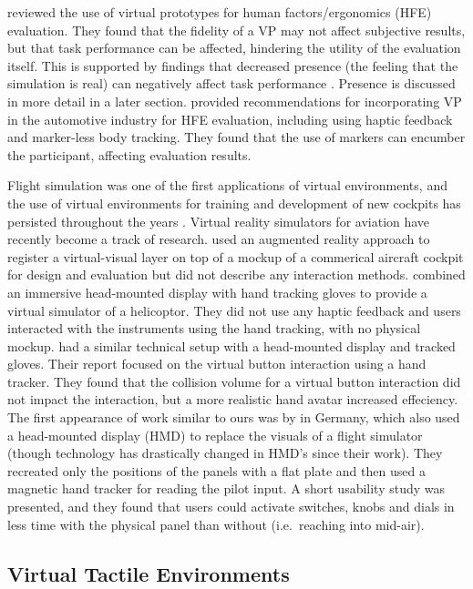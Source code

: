 \citet{aromaa_suitability_2016} reviewed the use of virtual prototypes for human factors/ergonomics (HFE) evaluation.
They found that the fidelity of a VP may not affect subjective results, but that task performance can be affected, hindering the utility of the evaluation itself.
This is supported by findings that decreased presence (the feeling that the simulation is real) can negatively affect task performance \citep{youngblut_relationship_2003}.
Presence is discussed in more detail in a later section.
\citet{lawson_future_2016} provided recommendations for incorporating VP in the automotive industry for HFE evaluation, including using haptic feedback and marker-less body tracking.
They found that the use of markers can encumber the participant, affecting evaluation results.

Flight simulation was one of the first applications of virtual environments, and the use of virtual environments for training and development of new cockpits has persisted throughout the years \citep{hancock_human_2008}.
Virtual reality simulators for aviation have recently become a track of research.
\citet{wan_mrstudio:_2011} used an augmented reality approach to register a virtual-visual layer on top of a mockup of a commerical aircraft cockpit for design and evaluation but did not describe any interaction methods.
\citet{yavrucuk_low_2011} combined an immersive head-mounted display with hand tracking gloves to provide a virtual simulator of a helicoptor.
They did not use any haptic feedback and users interacted with the instruments using the hand tracking, with no physical mockup.
\citet{aslandere_virtual_2015} had a similar technical setup with a head-mounted display and tracked gloves.
Their report focused on the virtual button interaction using a hand tracker.
They found that the collision volume for a virtual button interaction did not impact the interaction, but a more realistic hand avatar increased effeciency.
The first appearance of work similar to ours was by \citet{schiefele_simple_1998} in Germany, which also used a head-mounted display (HMD) to replace the visuals of a flight simulator (though technology has drastically changed in HMD's since their work).
They recreated only the positions of the panels with a flat plate and then used a magnetic hand tracker for reading the pilot input.
A short usability study was presented, and they found that users could activate switches, knobs and dials in less time with the physical panel than without (i.e.\ reaching into mid-air).


\subsection{Virtual Tactile Environments}
\label{virtual-tactile-environments}

